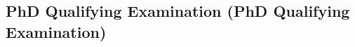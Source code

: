 \documentclass[12pt]{article}
\newcommand\eg{e.g.\xspace}
\newcommand\QE{PhD Qualifying Examination\xspace}
\newcommand{\course}[2][EMPTY]%
    {\ifthenelse%
        {\equal{#1}{EMPTY}}%
        {OCEA #2}%
        {#1 #2}%
    }
\newcommand{\parnum}{\arabic{parcount}}
\newcounter{parcount}
\newcommand\p{\stepcounter{parcount}\leavevmode{\raisebox{0.2ex}{\scriptsize[\parnum]}}\hspace{0.2em}}
\newcommand\cp{\setcounter{parcount}{0}}
\newcommand{\supcom}{Supervisory Committee\xspace}
\begin{document}
%
%
%
%
%
%
%
%
%
%

%


\subsection{\label{sec:phd_qualifying_examination}PhD Qualifying Examination (\QE)}
\end{document}
